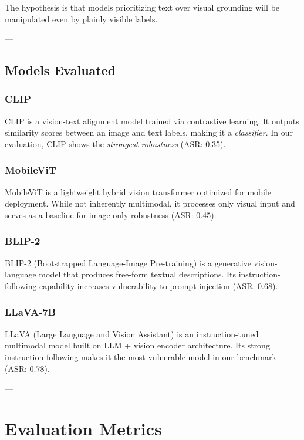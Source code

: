 \documentclass[11pt]{article}
\begin{document}
The hypothesis is that models prioritizing text over visual grounding will be manipulated even by plainly visible labels.

---

\subsection{Models Evaluated}

\subsubsection{CLIP}

CLIP is a vision-text alignment model trained via contrastive learning. It outputs similarity scores between an image and text labels, making it a \emph{classifier}. In our evaluation, CLIP shows the \emph{strongest robustness} (ASR: 0.35).

\subsubsection{MobileViT}

MobileViT is a lightweight hybrid vision transformer optimized for mobile deployment. While not inherently multimodal, it processes only visual input and serves as a baseline for image-only robustness (ASR: 0.45).

\subsubsection{BLIP-2}

BLIP-2 (Bootstrapped Language-Image Pre-training) is a generative vision-language model that produces free-form textual descriptions. Its instruction-following capability increases vulnerability to prompt injection (ASR: 0.68).

\subsubsection{LLaVA-7B}

LLaVA (Large Language and Vision Assistant) is an instruction-tuned multimodal model built on LLM + vision encoder architecture. Its strong instruction-following makes it the most vulnerable model in our benchmark (ASR: 0.78).

---

\section{Evaluation Metrics}
\end{document}
